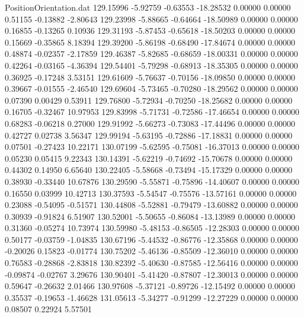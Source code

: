 \begin{filecontents}{PositionOrientation.dat}
 129.15996   -5.92759   -0.63553   -18.28532    0.00000    0.00000    0.51155   -0.13882   -2.80643
 129.23998   -5.88665   -0.64664   -18.50989    0.00000    0.00000    0.16855   -0.13265    0.10936
 129.31193   -5.87453   -0.65618   -18.50203    0.00000    0.00000    0.15669   -0.35865    8.18394
 129.39200   -5.86198   -0.68490   -17.84674    0.00000    0.00000    0.48874   -0.02357   -2.17859
 129.46387   -5.82685   -0.68659   -18.00331    0.00000    0.00000    0.42264   -0.03165   -4.36394
 129.54401   -5.79298   -0.68913   -18.35305    0.00000    0.00000    0.36925   -0.17248    3.53151
 129.61609   -5.76637   -0.70156   -18.09850    0.00000    0.00000    0.39667   -0.01555   -2.46540
 129.69604   -5.73465   -0.70280   -18.29562    0.00000    0.00000    0.07390    0.00429    0.53911
 129.76800   -5.72934   -0.70250   -18.25682    0.00000    0.00000    0.16705   -0.32467   10.97953
 129.83998   -5.71731   -0.72586   -17.46654    0.00000    0.00000    0.68283   -0.06218    0.27000
 129.91992   -5.66273   -0.73083   -17.44496    0.00000    0.00000    0.42727    0.02738    3.56347
 129.99194   -5.63195   -0.72886   -17.18831    0.00000    0.00000    0.07501   -0.27423   10.22171
 130.07199   -5.62595   -0.75081   -16.37013    0.00000    0.00000    0.05230    0.05415    9.22343
 130.14391   -5.62219   -0.74692   -15.70678    0.00000    0.00000    0.44302    0.14950    6.65640
 130.22405   -5.58668   -0.73494   -15.17329    0.00000    0.00000    0.38930   -0.33440   10.67876
 130.29590   -5.55871   -0.75896   -14.40607    0.00000    0.00000    0.16550    0.03999   10.42713
 130.37593   -5.54547   -0.75576   -13.57161    0.00000    0.00000    0.23088   -0.54095   -0.51571
 130.44808   -5.52881   -0.79479   -13.60882    0.00000    0.00000    0.30939   -0.91824    6.51907
 130.52001   -5.50655   -0.86084   -13.13989    0.00000    0.00000    0.31360   -0.05274   10.73974
 130.59980   -5.48153   -0.86505   -12.28303    0.00000    0.00000    0.50177   -0.03759   -1.04835
 130.67196   -5.44532   -0.86776   -12.35868    0.00000    0.00000   -0.20026    0.15823   -0.01774
 130.75202   -5.46136   -0.85509   -12.36010    0.00000    0.00000    0.76583   -0.28868   -2.83818
 130.82392   -5.40630   -0.87585   -12.56416    0.00000    0.00000   -0.09874   -0.02767    3.29676
 130.90401   -5.41420   -0.87807   -12.30013    0.00000    0.00000    0.59647   -0.26632    2.01466
 130.97608   -5.37121   -0.89726   -12.15492    0.00000    0.00000    0.35537   -0.19653   -1.46628
 131.05613   -5.34277   -0.91299   -12.27229    0.00000    0.00000    0.08507    0.22924    5.57501

\end{filecontents}
